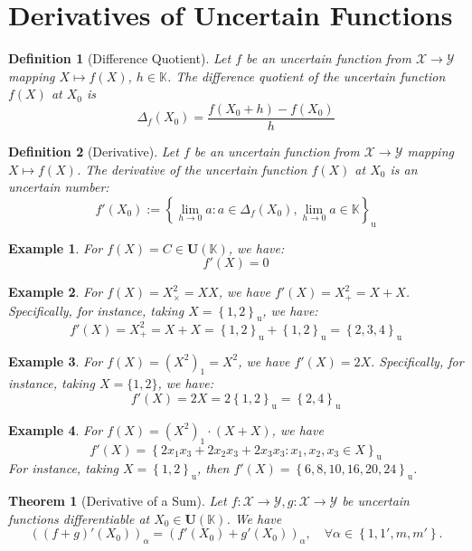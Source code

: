 \documentclass[a4paper,12pt, twoside]{memoir}
\newtheorem{definition}{Definition}[chapter]
\newtheorem{theorem}{Theorem}[chapter]
\newtheorem{example}{Example}[chapter]
\newcommand{\set}[1]{\left\{#1\right\}} %
\newcommand{\s}[1]{\set{#1}_\mathrm{u}} %
\newcommand{\tsbd}[1]{\mathbf{U}(\mathbb{#1})}
\begin{document}
\section{Derivatives of Uncertain Functions}

\begin{definition}[Difference Quotient]
	Let $f$ be an uncertain function from $\mathcal{X} \rightarrow \mathcal{Y}$ mapping $X \mapsto f(X)$, $h \in \mathbb{K}$.
	The difference quotient of the uncertain function $f(X)$ at $X_0$ is
	\[\Delta_f(X_0)= \frac{f(X_0 + h) - f(X_0)}{h}\]
\end{definition}

\begin{definition}[Derivative]
	Let $f$ be an uncertain function from $\mathcal{X} \rightarrow \mathcal{Y}$ mapping $X \mapsto f(X)$.
	The derivative of the uncertain function $f(X)$ at $X_0$ is an uncertain number:
	$$f'(X_0) := \s{\lim_{h\rightarrow 0}{a: a \in \Delta_f(X_0) , \lim_{h\rightarrow 0}a \in \mathbb{K}}}$$
\end{definition}

\begin{example}
	For $f(X) = C \in \tsbd{K}$, we have: $$f'(X) = 0$$
\end{example}

\begin{example}
	For $f(X) = X^2_\times = XX $, we have $f'(X) = X^2_+ = X+X$. Specifically, for instance, taking $X = \s{1,2}$, we have:
	$$f'(X) = X^2_+ = X+X = \s{1,2} + \s{1,2} = \s{2,3,4}$$
\end{example}

\begin{example}
	For $f(X) = (X^2)_1 = X^2 $, we have $f'(X) = 2X$. Specifically, for instance, taking $X = \{1,2\}$, we have:
	$$f'(X) = 2X = 2 \s{1,2} = \s{2,4}$$
\end{example}

\begin{example}
	For $f(X)= (X^2)_1\cdot (X+X)$, we have
	\[f'(X) = \s{2x_1x_3+2x_2x_3+2x_3x_3 : x_1,x_2,x_3 \in X}\]
	For instance, taking $X=\s{1,2}$, then $f'(X) = \s{6, 8, 10, 16, 20, 24}$.
\end{example}

\begin{theorem}[Derivative of a Sum]
	Let $f : \mathcal{X} \to \mathcal{Y}, g : \mathcal{X} \to \mathcal{Y}$ be uncertain functions differentiable at $X_0 \in \tsbd{K}$. We have
	\[
		((f+g)'(X_0))_\alpha = (f'(X_0) + g'(X_0))_\alpha, \quad \forall \alpha \in \set{1,1', m,m'}.
	\]
\end{theorem}
\end{document}
